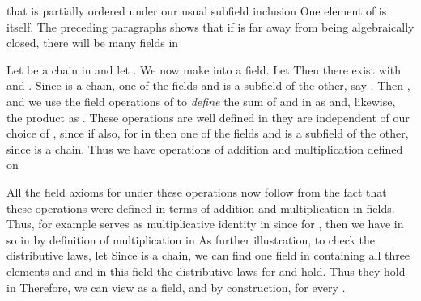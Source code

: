 \documentclass[11pt,oneside]{article}
\begin{document}
\begin{BookBody}
\noindent that is partially ordered under our usual subfield inclusion  One element of  is  itself. The preceding paragraphs shows that if  is far away from being algebraically closed, there will be many fields  in 

Let  be a chain in  and let . We now make  into a field. Let  Then there exist  with  and . Since  is a chain, one of the fields  and  is a subfield of the other, say . Then , and we use the field operations of  to\textit{ define} the sum of \BookInline{\alpha } and \BookInline{\beta } in  as  and, likewise, the product as . These operations are well defined in  they are independent of our choice of , since if \BookInline{\alpha,\allowbreak }  also, for  in  then one of the fields  and  is a subfield of the other, since  is a chain. Thus we have operations of addition and multiplication defined on 

All the field axioms for  under these operations now follow from the fact that these operations were defined in terms of addition and multiplication in fields. Thus, for example serves as multiplicative identity in  since for , then we have \BookInline{1\alpha = \alpha } in  so \BookInline{1\alpha = \alpha } in  by definition of multiplication in  As further illustration, to check the distributive laws, let  Since  is a chain, we can find one field in  containing all three elements \BookInline{\alpha,\allowbreak \beta,\allowbreak } and \BookInline{\gamma,\allowbreak } and in this field the distributive laws for \BookInline{\alpha,\allowbreak \beta,\allowbreak } and \BookInline{\gamma } hold. Thus they hold in  Therefore, we can view  as a field, and by construction,  for every .


\end{BookBody}
\end{document}
